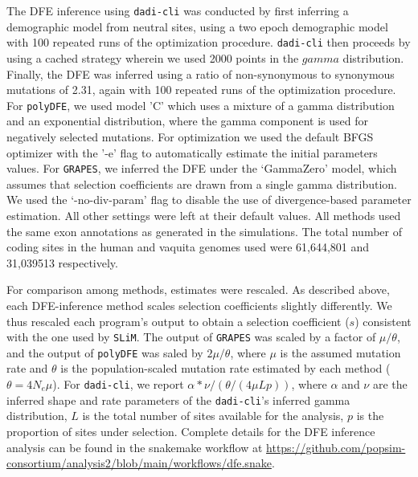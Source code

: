 \documentclass[hidelinks]{article}
\newcommand{\slim}{\texttt{SLiM}\xspace}
\newcommand{\polydfe}{\texttt{polyDFE}\xspace}
\newcommand{\dadicli}{\texttt{dadi-cli}\xspace}
\newcommand{\grapes}{\texttt{GRAPES}\xspace}
\begin{document}
    The DFE inference using \dadicli was conducted by first inferring a demographic model from neutral sites,
    using a two epoch demographic model with 100 repeated runs of the optimization procedure.
    \dadicli then proceeds by using a cached strategy wherein we used 2000 points in the $gamma$ distribution.
    Finally, the DFE was inferred using a ratio of non-synonymous to synonymous mutations of 2.31, again with 
    100 repeated runs of the optimization procedure.
    For \polydfe, we used model 'C' which uses a mixture of a gamma distribution and an exponential distribution,
    where the gamma component is used for negatively selected mutations. For optimization we used
    the default BFGS optimizer with the '-e' flag to automatically estimate the initial parameters values.
    For \grapes, we inferred the DFE under the `GammaZero' model, which assumes that selection coefficients
    are drawn from a single gamma distribution. We used the `-no-div-param' flag to disable the use
    of divergence-based parameter estimation. All other settings were left at their default values.
    All methods used the same exon annotations as generated in the simulations. The total number of coding sites
    in the human and vaquita genomes used were 61,644,801 and 31,039513 respectively.

    For comparison among methods, estimates were rescaled. 
    As described above, each DFE-inference method scales selection coefficients slightly differently.
    We thus rescaled each program's output to obtain a selection coefficient ($s$) consistent with the one used by \slim.
    The output of \grapes  was scaled by a factor of  $\mu / \theta$,
    and the output of \polydfe was saled by $2 \mu / \theta$, 
    where $\mu$ is the assumed mutation rate and 
    $\theta$ is the population-scaled mutation rate estimated by each method ($\theta = 4N_{e}\mu$).
    For \dadicli, we report $\alpha * \nu / (\theta / (4 \mu L p))$, where
    $\alpha$ and $\nu$ are the inferred shape and rate parameters of the \dadicli's inferred gamma distribution,
    $L$ is the total number of sites available for the analysis,
    $p$ is the proportion of sites under selection. 
    Complete details for the DFE inference analysis can be found in the
    snakemake workflow at \url{https://github.com/popsim-consortium/analysis2/blob/main/workflows/dfe.snake}.
\end{document}
